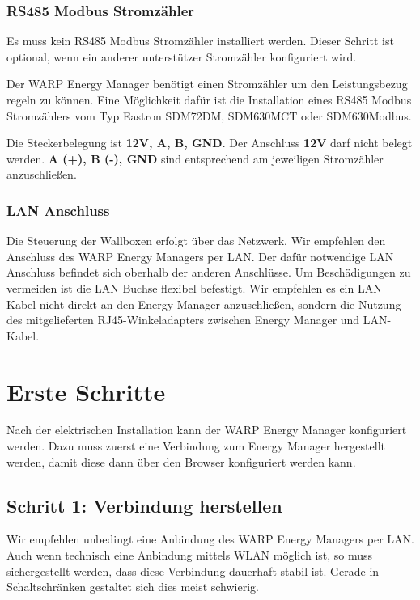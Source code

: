 \documentclass[a4paper,10pt]{article}
\newcommand{\hint}[1]{\begin{tcolorbox}[colback=boxgray,colframe=black,coltext=
white,title=Hinweis,left*=2mm,right*=2mm,boxsep=1mm,bottom=1mm,top=1mm]#1\end{tcolorbox}}
\begin{document}
\begin{multicols*}{2}
	\subsubsection{RS485 Modbus Stromzähler}
	\hint{Es muss kein RS485 Modbus Stromzähler installiert werden. Dieser
	Schritt ist optional, wenn ein anderer unterstützer Stromzähler konfiguriert
	wird.}

	Der WARP Energy Manager benötigt einen Stromzähler um den Leistungsbezug regeln zu 
	können. Eine Möglichkeit dafür ist die Installation eines RS485 Modbus
	Stromzählers vom Typ Eastron SDM72DM, SDM630MCT oder SDM630Modbus.
	
	Die Steckerbelegung ist \textbf{12V, A, B, GND}. Der Anschluss \textbf{12V}
	darf nicht belegt werden. \textbf{A (+), B (-), GND} sind entsprechend 
	am jeweiligen Stromzähler anzuschließen.

	\subsubsection{LAN Anschluss}
	Die Steuerung der Wallboxen erfolgt über das Netzwerk. Wir empfehlen den
	Anschluss des WARP Energy Managers per LAN. Der dafür notwendige LAN
	Anschluss befindet sich oberhalb der anderen Anschlüsse. Um Beschädigungen
	zu vermeiden ist die LAN Buchse flexibel befestigt. Wir empfehlen es ein LAN
	Kabel nicht direkt an den Energy Manager anzuschließen, sondern die Nutzung 
	des mitgelieferten RJ45-Winkeladapters zwischen Energy Manager und
	LAN-Kabel.

	\newpage
	\section{Erste Schritte}

	Nach der elektrischen Installation kann der WARP Energy Manager konfiguriert
	werden. Dazu muss zuerst eine Verbindung zum Energy Manager hergestellt werden, 
	damit diese dann über den Browser konfiguriert werden kann.

	\subsection{Schritt 1: Verbindung herstellen}


	\hint{Wir empfehlen unbedingt eine Anbindung des WARP Energy Managers per
	LAN. Auch wenn technisch eine Anbindung mittels WLAN möglich ist, so muss
	sichergestellt werden, dass diese Verbindung dauerhaft stabil ist. Gerade in
	Schaltschränken gestaltet sich dies meist schwierig.}


\end{multicols*}
\end{document}
